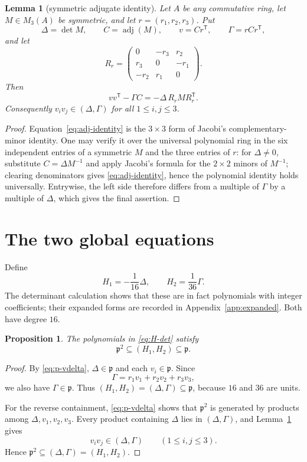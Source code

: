 \documentclass[11pt]{amsart}
\newtheorem{lemma}[theorem]{Lemma}
\newtheorem{proposition}[theorem]{Proposition}
\theoremstyle{remark}
\DeclareMathOperator{\adj}{adj}
\begin{document}
\begin{lemma}[symmetric adjugate identity]\label{lem:adj}
Let $A$ be any commutative ring, let $M\in M_3(A)$ be symmetric, and let $r=(r_1,r_2,r_3)$.  Put
\[
 \Delta=\det M,\qquad C=\adj(M),\qquad v=Cr^{\mathsf T},\qquad \Gamma=rCr^{\mathsf T},
\]
and let
\[
 R_r=
 \begin{pmatrix}
0&-r_3&r_2\\
r_3&0&-r_1\\
-r_2&r_1&0
\end{pmatrix}.
\]
Then
\begin{equation}\label{eq:adj-identity}
 vv^{\mathsf T}-\Gamma C=-\Delta\,R_rMR_r^{\mathsf T}.
\end{equation}
Consequently $v_iv_j\in(\Delta,\Gamma)$ for all $1\le i,j\le3$.
\end{lemma}

\begin{proof}
Equation~\eqref{eq:adj-identity} is the $3\times3$ form of Jacobi's complementary-minor identity.  One may verify it over the universal polynomial ring in the six independent entries of a symmetric $M$ and the three entries of $r$: for $\Delta\ne0$, substitute $C=\Delta M^{-1}$ and apply Jacobi's formula for the $2\times2$ minors of $M^{-1}$; clearing denominators gives \eqref{eq:adj-identity}, hence the polynomial identity holds universally.  Entrywise, the left side therefore differs from a multiple of $\Gamma$ by a multiple of $\Delta$, which gives the final assertion.
\end{proof}

\section{The two global equations}\label{sec:global}
Define
\begin{equation}\label{eq:H-det}
 H_1=-\frac1{16}\Delta,
 \qquad
 H_2=\frac1{36}\Gamma.
\end{equation}
The determinant calculation shows that these are in fact polynomials with integer coefficients; their expanded forms are recorded in Appendix~\ref{app:expanded}.  Both have degree $16$.

\begin{proposition}\label{prop:containment}
The polynomials in \eqref{eq:H-det} satisfy
\[
 \mathfrak p^2\subseteq(H_1,H_2)\subseteq\mathfrak p.
\]
\end{proposition}

\begin{proof}
By \eqref{eq:p-vdelta}, $\Delta\in\mathfrak p$ and each $v_i\in\mathfrak p$.  Since
\[
 \Gamma=r_1v_1+r_2v_2+r_3v_3,
\]
we also have $\Gamma\in\mathfrak p$.  Thus $(H_1,H_2)=(\Delta,\Gamma)\subseteq\mathfrak p$, because $16$ and $36$ are units.

For the reverse containment, \eqref{eq:p-vdelta} shows that $\mathfrak p^2$ is generated by products among $\Delta,v_1,v_2,v_3$.  Every product containing $\Delta$ lies in $(\Delta,\Gamma)$, and Lemma~\ref{lem:adj} gives
\[
 v_iv_j\in(\Delta,\Gamma)
 \qquad(1\le i,j\le3).
\]
Hence $\mathfrak p^2\subseteq(\Delta,\Gamma)=(H_1,H_2)$.
\end{proof}
\end{document}
